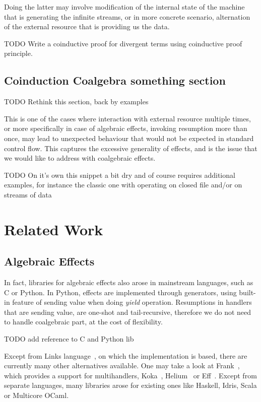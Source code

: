 \documentclass[declaration,shortabstract]{iithesis}
\theoremstyle{definition} \newtheorem{definition}{Definition}[chapter]
\theoremstyle{remark} \newtheorem{remark}[definition]{Observation}
\theoremstyle{plain} \newtheorem{theorem}[definition]{Theorem}
\theoremstyle{plain} \newtheorem{lemma}[definition]{Lemma}
\begin{document}
    Doing the latter may involve modification of the internal state of the
    machine that is generating the infinite streams, or in more concrete
    scenario, alternation of the external resource that is providing us the data.

    TODO Write a coinductive proof for divergent terms using coinductive proof
    principle.

\subsection{Coinduction Coalgebra something section}

    TODO Rethink this section, back by examples

    This is one of the cases where interaction with external resource multiple
    times, or more specifically in case of algebraic effects, invoking resumption more
    than once, may lead to unexpected behaviour that would not be expected in standard
    control flow. This captures the excessive generality of effects, and is the
    issue that we would like to address with coalgebraic effects.

    TODO On it's own this snippet a bit dry and of course requires additional examples,
    for instance the classic one with operating on closed file and/or on
    streams of data


\section{Related Work}
    \subsection{Algebraic Effects}

    In fact, libraries for algebraic effects also arose in mainstream languages,
    such as C or Python. In Python, effects are implemented through generators,
    using built-in feature of sending value when doing \textit{yield} operation.
    Resumptions in handlers that are sending value, are one-shot and tail-recursive,
    therefore we do not need to handle coalgebraic part, at the cost of flexibility.

    TODO add reference to C and Python lib

    Except from Links language~\cite{handlers-cps}, on which the implementation
    is based, there are currently many other alternatives available. One may take
    a look at Frank~\cite{frank}, which provides a support for multihandlers,
    Koka~\cite{leijen-koka}, Helium~\cite{helium} or Eff~\cite{eff}. Except from
    separate languages, many libraries arose for existing ones like Haskell,
    Idris, Scala or Multicore OCaml.
\end{document}
